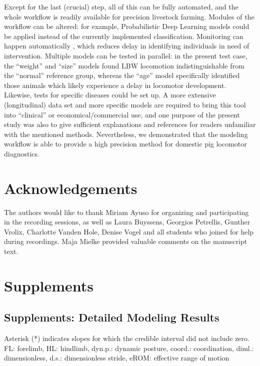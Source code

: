 Except for the last (crucial) step, all of this can be fully automated, and the whole workflow is readily available for precision livestock farming.
Modules of the workflow can be altered: for example, Probabilistic Deep Learning models could be applied instead of the currently implemented classification.
Monitoring can happen automatically \citep[as in][]{Litten2003,Netukova2021}, which reduces delay in identifying individuals in need of intervention.
Multiple models can be tested in parallel: in the present test case, the ``weight'' and ``size'' models found LBW locomotion indistinguishable from the ``normal'' reference group, whereas the ``age'' model specifically identified those animals which likely experience a delay in locomotor development.
Likewise, tests for specific diseases could be set up.
A more extensive (longitudinal) data set and more specific models are required to bring this tool into ``clinical'' or economical/commercial use, and one purpose of the present study was also to give sufficient explanations and references for readers unfamiliar with the mentioned methods.
Nevertheless, we demonstrated that the modeling workflow is able to provide a high precision method for domestic pig locomotor diagnostics.




\FloatBarrier
\clearpage
\section{Acknowledgements}
\label{sec:org2d8bfbc}
The authors would like to thank Miriam Ayuso for organizing and participating in the recording sessions, as well as Laura Buyssens, Georgios Petrellis, Gunther Vrolix, Charlotte Vanden Hole, Denise Vogel and all students who joined for help during recordings.
Maja Mielke provided valuable comments on the manuscript text.


\FloatBarrier
\clearpage
\section{Supplements}
\label{supplements}
\subsection{Supplements: Detailed Modeling Results}
\label{supp:modelresults}
\footnotesize \setlength\extrarowheight{0pt} 
Asterisk (*) indicates slopes for which the credible interval did not include zero. FL: forelimb, HL: hindlimb, dyn.p.: dynamic posture, coord.: coordination, diml.: dimensionless, d.s.: dimensionless stride, eROM: effective range of motion

